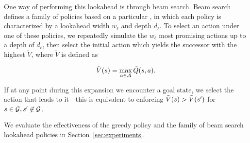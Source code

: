 One way of performing this lookahead is through beam search. Beam search defines
a family of policies based on a particular \approxq{}, in which each policy is
characterized by a lookahead width $w_\ell$ and depth $d_\ell$. To select an action under
one of these policies, we repeatedly simulate the $w_\ell$ most promising actions up
to a depth of $d_\ell$, then select the initial action which yields the successor
with the highest $\tilde{V}$, where $\tilde{V}$ is defined as

\begin{equation}
  \tilde{V}(s) = \max_{a \in \mathcal{A}} \tilde{Q}(s, a).
\end{equation}


If at any point during this expansion we encounter a goal state, we select the
action that leads to it---this is equivalent to enforcing
$\tilde{V}(s{}) > \tilde{V}(s{}')$ for $s{} \in
\mathcal{G}{}, s{}' \not\in \mathcal{G}{}$.

We evaluate the effectiveness of the greedy policy and the family of beam search
lookahead policies in Section~\ref{sec:experiments}.
